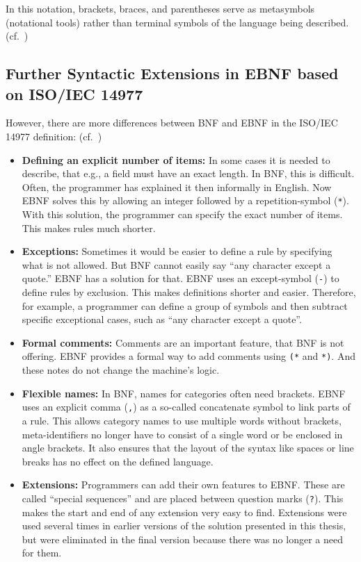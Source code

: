In this notation, brackets, braces, and parentheses serve as metasymbols (notational tools) rather than terminal symbols of the language being described. (cf.~\cite[pp.~149-151]{SebestaConceptsEdition})

\subsection{Further Syntactic Extensions in EBNF based on ISO/IEC 14977}

However, there are more differences between BNF and EBNF in the ISO/IEC 14977 definition: (cf.~\cite[p.~VII]{ISO/IEC149771996InformationBNF})

\begin{itemize}
    \item \textbf{Defining an explicit number of items:} In some cases it is needed to describe, that e.g., a field must have an exact length. In BNF, this is difficult. Often, the programmer has explained it then informally in English. Now EBNF solves this by allowing an integer followed by a repetition-symbol (\texttt{*}). With this solution, the programmer can specify the exact number of items. This makes rules much shorter.
    
    \item \textbf{Exceptions:} Sometimes it would be easier to define a rule by specifying what is not allowed. But BNF cannot easily say ``any character except a quote.'' EBNF has a solution for that. EBNF uses an except-symbol (\texttt{-}) to define rules by exclusion. This makes definitions shorter and easier. Therefore, for example, a programmer can define a group of symbols and then subtract specific exceptional cases, such as ``any character except a quote''.
    
    \item \textbf{Formal comments:} Comments are an important feature, that BNF is not offering. EBNF provides a formal way to add comments using \texttt{(*} and \texttt{*)}. And these notes do not change the machine's logic.
    
    \item \textbf{Flexible names:} In BNF, names for categories often need brackets. EBNF uses an explicit comma (\texttt{,}) as a so-called concatenate symbol to link parts of a rule. This allows category names to use multiple words without brackets, meta-identifiers no longer have to consist of a single word or be enclosed in angle brackets. It also ensures that the layout of the syntax like spaces or line breaks has no effect on the defined language.
    
    \item \textbf{Extensions:} Programmers can add their own features to EBNF. These are called ``special sequences'' and are placed between question marks (\texttt{?}). This makes the start and end of any extension very easy to find. Extensions were used several times in earlier versions of the solution presented in this thesis, but were eliminated in the final version because there was no longer a need for them.
\end{itemize}

